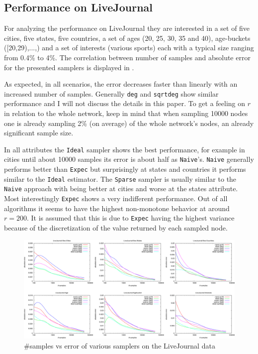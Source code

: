 \subsection{Performance on LiveJournal}
For analyzing the performance on LiveJournal they are interested in a set of five cities, five states, five countries, a set of ages (20, 25, 30, 35 and 40), age-buckets ([20,29),...,) and a set of interests (various sports) each with a typical size ranging from 0.4\% to 4\%.
The correlation between number of samples and absolute error for the presented samplers is displayed in .

As expected, in all scenarios, the error decreases faster than linearly with an increased number of samples.
Generally \texttt{deg} and \texttt{sqrtdeg} show similar performance and I will not discuss the details in this paper.
To get a feeling on $r$ in relation to the whole network, keep in mind that when sampling 10000 nodes one is already sampling 2\% (on average) of the whole network's nodes, an already significant sample size.

In all attributes the \texttt{Ideal} sampler shows the best performance, for example in cities until about 10000 samples its error is about half as \texttt{Naive}'s.
\texttt{Naive} generally performs better than \texttt{Expec} but surprisingly at states and countries it performs similar to the \texttt{Ideal} estimator.
The \texttt{Sparse} sampler is usually similar to the \texttt{Naive} approach with being better at cities and worse at the states attribute.
Most interestingly \texttt{Expec} shows a very indifferent performance. Out of all algorithms it seems to have the highest non-monotone behavior at around $r=200$. It is assumed that this is due to \texttt{Expec} having the highest variance because of the discretization of the value returned by each sampled node.
\begin{figure}[!ht]
  \begin{center}
    \includegraphics[width=\linewidth]{fig2_3}
    \caption{\#samples vs error of various samplers on the LiveJournal data \cite{dasgupta2012social}}
  \end{center}
\end{figure}

